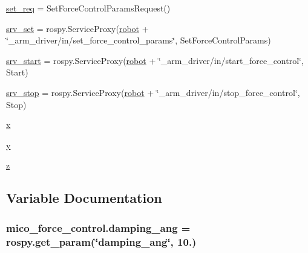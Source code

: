 \begin{DoxyCompactItemize}
\hyperlink{namespacemico__force__control_adaac210d765d56a858099e0da5985634}{set\+\_\+req} = Set\+Force\+Control\+Params\+Request()
\item 
\hyperlink{namespacemico__force__control_aec902d9fa26ad89858657a5c69604244}{srv\+\_\+set} = rospy.\+Service\+Proxy(\hyperlink{namespacemico__force__control_ae3d8428c9fe2a197c78735d5e2bf7d13}{robot} + \char`\"{}\+\_\+arm\+\_\+driver/in/set\+\_\+force\+\_\+control\+\_\+params\char`\"{}, Set\+Force\+Control\+Params)
\item 
\hyperlink{namespacemico__force__control_ad419a15a7ffa6346e96486103e629a03}{srv\+\_\+start} = rospy.\+Service\+Proxy(\hyperlink{namespacemico__force__control_ae3d8428c9fe2a197c78735d5e2bf7d13}{robot} + \char`\"{}\+\_\+arm\+\_\+driver/in/start\+\_\+force\+\_\+control\char`\"{}, Start)
\item 
\hyperlink{namespacemico__force__control_a2cebf1d67600a8e0e30509e127b2ca15}{srv\+\_\+stop} = rospy.\+Service\+Proxy(\hyperlink{namespacemico__force__control_ae3d8428c9fe2a197c78735d5e2bf7d13}{robot} + \char`\"{}\+\_\+arm\+\_\+driver/in/stop\+\_\+force\+\_\+control\char`\"{}, Stop)
\item 
\hyperlink{namespacemico__force__control_aa9fdd2ef1b77ee897f0d602302379821}{x}
\item 
\hyperlink{namespacemico__force__control_a8a0f8c92894b08350a0d164ffac7d643}{y}
\item 
\hyperlink{namespacemico__force__control_a5537f83e86fedd5a78e2bbaab62d326f}{z}
\end{DoxyCompactItemize}


\subsection{Variable Documentation}
\subsubsection[{\texorpdfstring{damping\+\_\+ang}{damping_ang}}]{\setlength{\rightskip}{0pt plus 5cm}mico\+\_\+force\+\_\+control.\+damping\+\_\+ang = rospy.\+get\+\_\+param(\char`\"{}damping\+\_\+ang\char`\"{}, 10.)}\hypertarget{namespacemico__force__control_a92927656a13dc0f41e49ba262d47d74a}{}\label{namespacemico__force__control_a92927656a13dc0f41e49ba262d47d74a}
